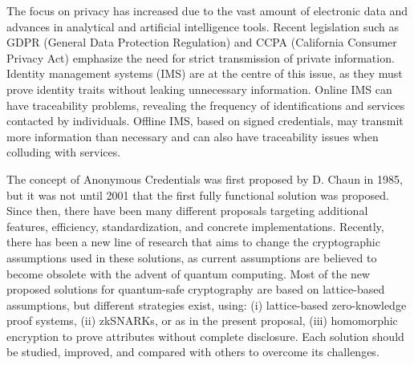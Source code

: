 The focus on privacy has increased due to the vast amount of electronic data and advances in analytical and artificial intelligence tools. Recent legislation such as GDPR (General Data Protection Regulation) \cite{GDPR2016a} and CCPA (California Consumer Privacy Act) \cite{bukatyCaliforniaConsumerPrivacy2019} emphasize the need for strict transmission of private information. Identity management systems (IMS) are at the centre of this issue, as they must prove identity traits without leaking unnecessary information. Online IMS can have traceability problems, revealing the frequency of identifications and services contacted by individuals. Offline IMS, based on signed credentials, may transmit more information than necessary and can also have traceability issues when colluding with services.

The concept of Anonymous Credentials was first proposed by D. Chaun in 1985\cite{chaumSecurityIdentificationTransaction1985}, but it was not until 2001 that the first fully functional solution was proposed\cite{camenischEfficientSystemNontransferable2001}. Since then, there have been many different proposals targeting additional features\cite{laponAnalysisRevocationStrategies2011,garmanDecentralizedAnonymousCredentials2013,camenischEfficientAttributesAnonymous2012,connollyImprovedConstructionsAnonymous2022}, efficiency\cite{camenischAnonymousAttestationUsing2016a}, standardization\cite{curranAnonCredsSpecification2023}, and concrete implementations\cite{lodderAnonymousCredentials2019}. Recently, there has been a new line of research\cite{bootleFrameworkPracticalAnonymous2023,blazyEfficientImplementationPostQuantum2023,boschiniEfficientPostquantumSNARKs2020,jeudyLatticeSignatureEfficient2022,laiLatticebasedCommitTransferrableSignatures2023,boschiniRelaxedLatticeBasedSignatures2018} that aims to change the cryptographic assumptions used in these solutions, as current assumptions are believed to become obsolete with the advent of quantum computing. Most of the new proposed solutions for quantum-safe cryptography are based on lattice-based assumptions\cite{FIPS203,FIPS204}, but different strategies exist, using: (i) lattice-based zero-knowledge proof systems\cite{lyubashevskyLatticeBasedZeroKnowledgeProofs2022}, (ii) zkSNARKs\cite{boschiniEfficientPostquantumSNARKs2020}, or as in the present proposal, (iii) homomorphic encryption to prove attributes without complete disclosure. Each solution should be studied, improved, and compared with others to overcome its challenges.




